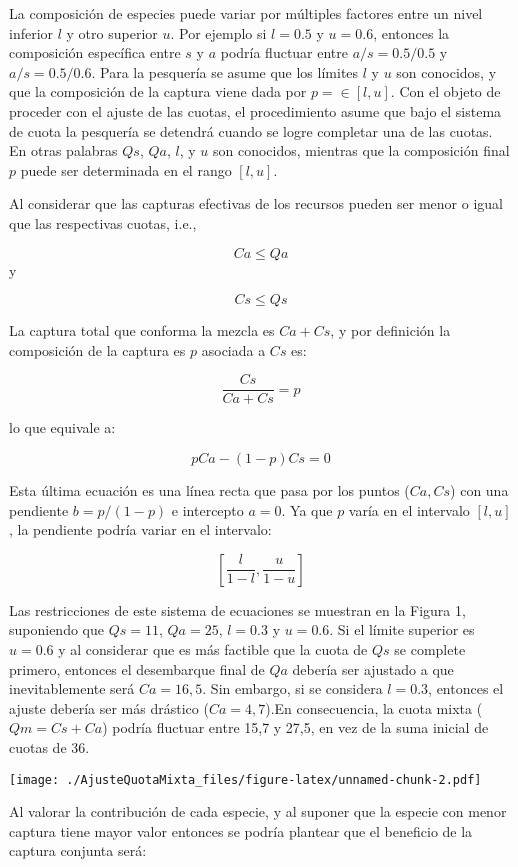 \documentclass[]{article}
\begin{document}
La composición de especies puede variar por múltiples factores entre un
nivel inferior $l$ y otro superior $u$. Por ejemplo si $l=0.5$ y
$u=0.6$, entonces la composición específica entre $s$ y $a$ podría
fluctuar entre $a/s=0.5/0.5$ y $a/s=0.5/0.6$. Para la pesquería se asume
que los límites $l$ y $u$ son conocidos, y que la composición de la
captura viene dada por $p=\in [l,u]$. Con el objeto de proceder con el
ajuste de las cuotas, el procedimiento asume que bajo el sistema de
cuota la pesquería se detendrá cuando se logre completar una de las
cuotas. En otras palabras $Qs$, $Qa$, $l$, y $u$ son conocidos, mientras
que la composición final $p$ puede ser determinada en el rango $[l,u]$.

Al considerar que las capturas efectivas de los recursos pueden ser
menor o igual que las respectivas cuotas, i.e.,

\[Ca \leq Qa\] y

\[Cs \leq Qs\]

La captura total que conforma la mezcla es $Ca+Cs$, y por definición la
composición de la captura es $p$ asociada a $Cs$ es:

\[\frac{Cs}{Ca+Cs}=p\]

lo que equivale a:

\[pCa-(1-p)Cs=0\]

Esta última ecuación es una línea recta que pasa por los puntos
($Ca,Cs$) con una pendiente $b=p/(1-p)$ e intercepto $a=0$. Ya que $p$
varía en el intervalo $[l,u]$, la pendiente podría variar en el
intervalo:

\[[\frac{l}{1-l},\frac{u}{1-u}]\]

Las restricciones de este sistema de ecuaciones se muestran en la Figura
1, suponiendo que $Qs=11$, $Qa=25$, $l=0.3$ y $u=0.6$. Si el límite
superior es $u=0.6$ y al considerar que es más factible que la cuota de
$Qs$ se complete primero, entonces el desembarque final de $Qa$ debería
ser ajustado a que inevitablemente será $Ca=16,5$. Sin embargo, si se
considera $l=0.3$, entonces el ajuste debería ser más drástico
($Ca=4,7$).En consecuencia, la cuota mixta ($Qm=Cs+Ca$) podría fluctuar
entre 15,7 y 27,5, en vez de la suma inicial de cuotas de 36.

\texttt{[image: ./AjusteQuotaMixta\_files/figure-latex/unnamed-chunk-2.pdf]}

Al valorar la contribución de cada especie, y al suponer que la especie
con menor captura tiene mayor valor entonces se podría plantear que el
beneficio de la captura conjunta será:
\end{document}
